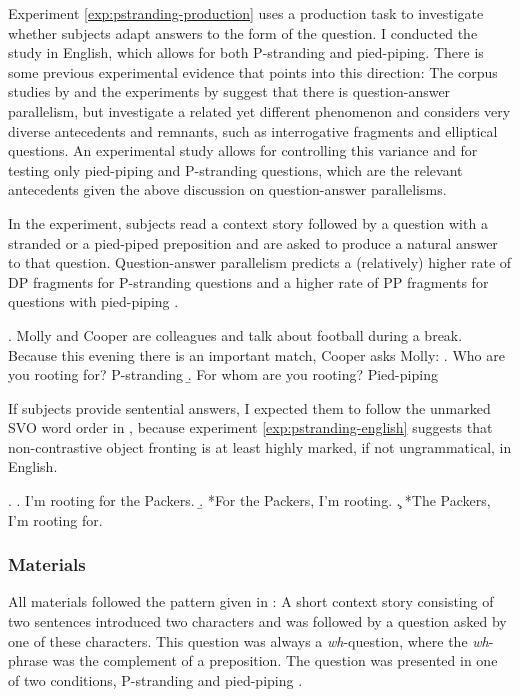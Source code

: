 Experiment \ref{exp:pstranding-production} uses a production task to investigate whether subjects adapt answers to the form of the question. I conducted the study in English, which allows for both P-stranding and pied-piping. There is some previous experimental evidence that points into this direction: The corpus studies by \citet{nykiel2014, nykiel2017} and the experiments by \citet{levelt.kelter1982} suggest that there is question-answer parallelism, but \citet{levelt.kelter1982} investigate a related yet different phenomenon and \citet{nykiel2014, nykiel2017} considers very diverse antecedents and remnants, such as interrogative fragments and elliptical questions. An experimental study allows for controlling this variance and for testing only pied-piping and P-stranding questions, which are the relevant antecedents given the above discussion on question-answer parallelisms.

In the experiment, subjects read a context story followed by a question with a stranded \Next[a] or a pied-piped \Next[b] preposition and are asked to produce a natural answer to that question. Question-answer parallelism predicts a (relatively) higher rate of DP fragments for P-stranding questions \Next[a] and a higher rate of PP fragments for questions with pied-piping \Next[b]. 

\ex. Molly and Cooper are colleagues and talk about football during a break. Because this evening there is an important match, Cooper asks Molly:
\a. Who are you rooting for? \hfill P-stranding
\b. For whom are you rooting? \hfill Pied-piping

If subjects provide sentential answers, I expected them to follow the unmarked SVO word order in \Next[a], because experiment \ref{exp:pstranding-english} suggests that non-con\-tras\-tive object fronting \Next[b,c] is at least highly marked, if not ungrammatical, in English.

\ex. \a. I'm rooting for the Packers.
     \b. *For the Packers, I'm rooting.
     \c. *The Packers, I'm rooting for.

\subsubsection{Materials}
All materials followed the pattern given in \LLast: A short context story consisting of two sentences introduced two characters and was followed by a question asked by one of these characters. This question was always a \textit{wh}-question, where the \textit{wh}-phrase was the complement of a preposition. The question was presented in one of two conditions, P-stranding \LLast[a] and pied-piping \LLast[b]. %

